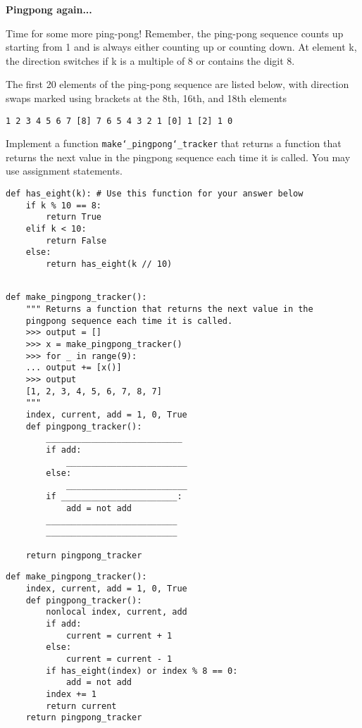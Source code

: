 \begin{blocksection}
\question \textbf{Pingpong again...}\\
\begin{nonsol}
Time for some more ping-pong!
Remember, the ping-pong sequence counts up starting from 1 and is
always either counting up or counting down. At element k, the direction switches if k is a multiple of 8 or contains the
digit 8.

The first 20 elements of the ping-pong sequence are listed below, with direction
swaps marked using brackets at the 8th, 16th, and 18th elements
\begin{lstlisting}
1 2 3 4 5 6 7 [8] 7 6 5 4 3 2 1 [0] 1 [2] 1 0
\end{lstlisting}
\end{nonsol}

Implement a function \texttt{make\char`_pingpong\char`_tracker} that returns a function that returns
the next value in the pingpong sequence each time it is called. You may use assignment statements.
\newline

\begin{lstlisting}
def has_eight(k): # Use this function for your answer below
    if k % 10 == 8:
        return True
    elif k < 10:
        return False
    else:
        return has_eight(k // 10)
\end{lstlisting}

\begin{nonsol}
\begin{lstlisting}

def make_pingpong_tracker():
    """ Returns a function that returns the next value in the
    pingpong sequence each time it is called.
    >>> output = []
    >>> x = make_pingpong_tracker()
    >>> for _ in range(9):
    ... output += [x()]
    >>> output
    [1, 2, 3, 4, 5, 6, 7, 8, 7]
    """
    index, current, add = 1, 0, True
    def pingpong_tracker():
        ___________________________
        if add:
            ________________________
        else:
            ________________________
        if _______________________:
            add = not add
        __________________________
        __________________________

    return pingpong_tracker
\end{lstlisting}
\end{nonsol}

\begin{solution}
\begin{lstlisting}
def make_pingpong_tracker():
    index, current, add = 1, 0, True
    def pingpong_tracker():
        nonlocal index, current, add
        if add:
            current = current + 1
        else:
            current = current - 1
        if has_eight(index) or index % 8 == 0:
            add = not add
        index += 1
        return current
    return pingpong_tracker
\end{lstlisting}
\end{solution}

\end{blocksection}

